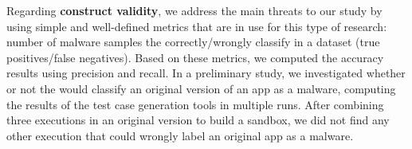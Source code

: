 \begin{comment}    
Regarding the \textbf{correlation between dataset properties and accuracy drop}, after running statistical tests (logistic regression),
we could not find evidence that the \emph{diversity} of the
complete dataset---in terms of similarity score and types of malware-
is responsible for the higher number of false negatives of the mining
sandbox approach. This implies that there was no 1-1 correlation between the brackets of similarity index, malware types to the drops in accuracy. Therefore, further research is necessary to investigate
other possible reasons for that. Perhaps, the complete dataset
contains a large percentage of malware that use more
advanced techniques to evade from both static and dynamic analysis---
both methods are used in the mining sandbox approach
we discussed in this paper.
\end{comment}


Regarding {\bf construct validity}, we address the main threats to our study by using simple and
well-defined metrics that are in use for this type of research: number of malware samples the
\mas correctly/wrongly classify in a dataset (true positives/false negatives).
Based on these metrics, we computed the accuracy results using precision and recall. In a preliminary study, we
investigated whether or not the \mas would classify an original version of an app as a malware,
computing the results of the test case generation tools in multiple runs. After combining three executions
in an original version to build a sandbox, we did not find any other execution that could wrongly
label an original app as a malware. 
